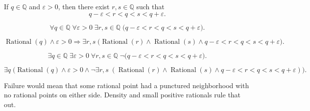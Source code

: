 \begin{tcolorbox}[colback=thmbox, colframe=thmborder, arc=2pt,
  left=6pt, right=6pt, top=4pt, bottom=4pt,
  title={\small\textbf{Lemma (Upper/Lower Perturbation Lemma, Rational Version)}},
  fonttitle=\small\bfseries]
\begin{lemma}
\label{lem:rational-upper-lower-perturbation}
If $q\in\mathbb{Q}$ and $\varepsilon>0$, then there exist $r,s\in\mathbb{Q}$
such that
\[
q-\varepsilon < r < q < s < q+\varepsilon.
\]
\end{lemma}
\end{tcolorbox}

\begin{remark*}
\[
\forall q\in\mathbb{Q}\;\forall \varepsilon>0\;
\exists r,s\in\mathbb{Q}\;
\bigl(q-\varepsilon < r < q < s < q+\varepsilon\bigr).
\]
\end{remark*}

\begin{remark*}
\[
\operatorname{Rational}(q)\land \varepsilon>0
\Longrightarrow
\exists r,s\;
\bigl(
\operatorname{Rational}(r)\land \operatorname{Rational}(s)\land
q-\varepsilon<r<q<s<q+\varepsilon
\bigr).
\]
\end{remark*}

\begin{remark*}
\[
\exists q\in\mathbb{Q}\;\exists \varepsilon>0\;
\forall r,s\in\mathbb{Q}\;
\neg\bigl(q-\varepsilon < r < q < s < q+\varepsilon\bigr).
\]
\end{remark*}

\begin{remark*}
\[
\exists q\;\bigl(\operatorname{Rational}(q)\land \varepsilon>0 \land
\neg\exists r,s\;(\operatorname{Rational}(r)\land \operatorname{Rational}(s)\land
q-\varepsilon<r<q<s<q+\varepsilon)\bigr).
\]
\end{remark*}

\begin{remark*}
Failure would mean that some rational point had a punctured neighborhood with
no rational points on either side. Density and small positive rationals rule
that out.
\end{remark*}

